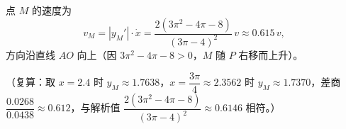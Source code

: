 \begin{answer}
点 $M$ 的速度为
\nopagebreak[4]
\[
v_M=\left|y_M'\right|\cdot\dot x=\frac{2(3\pi^2-4\pi-8)}{(3\pi-4)^2}\,v\approx0.615\,v,
\]
方向沿直线 $AO$ 向上（因 $3\pi^2-4\pi-8>0$，$M$ 随 $P$ 右移而上升）。

（复算：取 $x=2.4$ 时 $y_M\approx1.7638$，$x=\dfrac{3\pi}4\approx2.3562$ 时 $y_M\approx1.7370$，差商 $\dfrac{0.0268}{0.0438}\approx0.612$，与解析值 $\dfrac{2(3\pi^2-4\pi-8)}{(3\pi-4)^2}\approx0.6146$ 相符。）


\end{answer}